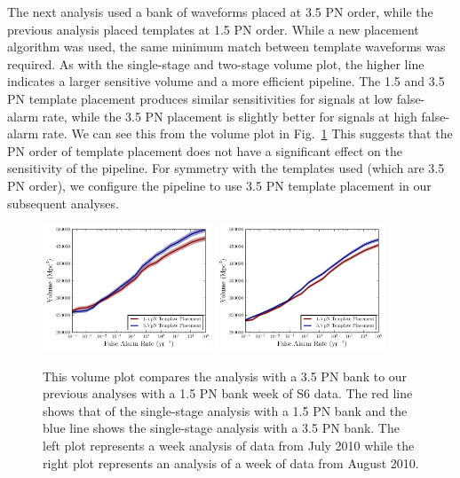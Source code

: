\documentclass[12pt]{iopart} \usepackage{graphicx,amssymb}
\begin{document}
The next analysis used a bank of waveforms placed at 3.5 PN order, while the
previous analysis placed templates at 1.5 PN order. While a new placement
algorithm was used, the same minimum match between template waveforms was
required. As with the single-stage and two-stage volume plot, the higher line
indicates a larger sensitive volume and a more efficient pipeline.  The 1.5
and 3.5 PN template placement produces similar sensitivities for signals at
low false-alarm rate, while the 3.5 PN placement is slightly better for signals
at high false-alarm rate. We can see this from the volume plot in
Fig.~\ref{img:ahope_15} This suggests that the PN order of template placement
does not have a significant effect on the sensitivity of the
pipeline. For symmetry with the templates used (which are 3.5 PN order), we
configure the pipeline to use 3.5 PN template placement in our
subsequent analyses.
% 
\begin{figure}[tbp]
\begin{center}
\includegraphics[width=0.45\textwidth]{figures/volume_plots/bank_pn_order_w1_volume.pdf}
\includegraphics[width=0.45\textwidth]{figures/volume_plots/bank_pn_order_w2_volume.pdf}
\caption{This volume plot compares the analysis with a 3.5 PN bank to our
previous analyses with a 1.5 PN bank week of S6 data. The red line shows that
of the single-stage analysis with a 1.5 PN bank and the blue line shows the
single-stage analysis with a 3.5 PN bank. The left plot represents a week
analysis of data from July 2010 while the right plot represents an analysis of a week of data
from August 2010.} 
\label{img:ahope_15}
\end{center}
\end{figure}
\end{document}
